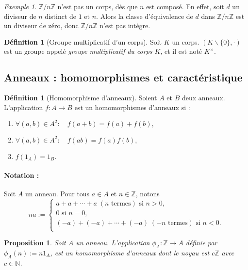 \documentclass[a4paper, titlepage]{article}
\newtheorem{prop}[theo]{Proposition}
\theoremstyle{definition}
\newtheorem{defi}[theo]{Définition}
\theoremstyle{remark}
\newtheorem{exem}[theo]{Exemple}
\def\N{\mathbb N}
\def\Z{\mathbb Z}
\begin{document}
\begin{exem}
$\Z/n\Z$ n'est pas un corps, dès que $n$ est composé. En effet, soit $d$ un diviseur de $n$ distinct de $1$ et $n$. Alors la classe d'équivalence de $d$ dans $\Z/n\Z$ est un diviseur de zéro, donc $\Z/n\Z$ n'est pas intègre.
\end{exem}

\begin{defi}[Groupe multiplicatif d'un corps]
Soit $K$ un corps. $(K\backslash\{0\},\cdot)$ est un groupe appelé \textit{groupe multiplicatif du corps $K$}, et il est noté $K^\times$.
\end{defi}

\subsection{Anneaux : homomorphismes et caractéristique}

\begin{defi}[Homomorphisme d'anneaux]\label{defMorphismeAnneaux}
Soient $A$ et $B$ deux anneaux. L'application $f: A \rightarrow B$ est un homomorphismes d'anneaux si : \begin{enumerate}
\item $\forall (a,b) \in A^2: \quad f(a+b) = f(a) + f(b)$,
\item $\forall (a,b) \in A^2: \quad f(ab) = f(a)f(b)$,
\item $f(1_A) = 1_B$.
\end{enumerate}
\end{defi}

\paragraph*{Notation :}
Soit $A$ un anneau. Pour tous $a \in A$ et $n \in \Z$, notons
$$na := \left\{\begin{array}{l}
a + a + \cdots + a \; (n \text{ termes}) \text{ si } n > 0,\\
0 \text{ si } n = 0,\\
(-a) + (-a) + \cdots + (-a)\; (-n \text{ termes}) \text{ si } n < 0.\\
\end{array}\right.$$

\begin{prop}
Soit $A$ un anneau. L'application $\phi_A : \Z \rightarrow A$ définie par $\phi_A(n) := n1_A$, est un homomorphisme d'anneaux dont le noyau est $c\Z$ avec $c\in \N$.
\end{prop}
\end{document}

